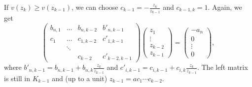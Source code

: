 \documentclass{amsart}
\theoremstyle{definition}
\begin{document}
{If $v(z_k)\geq v(z_{k-1})$, we can choose $c_{k-1}=-\frac{z_k}{z_{k-1}}$ and $c_{k-1,k}=1$. Again, we get 
\[\begin{pmatrix}
b_{n,1}&\ldots&b_{n,k-2}&b'_{n,k-1}\\
c_1&\ldots &c_{1,k-2}&c'_{1,k-1}\\
& \ddots &&\\
&&c_{k-2}&c'_{k-2,k-1}
\end{pmatrix}\begin{pmatrix}
z_1\\\vdots\\z_{k-2}\\z_{k-1}\end{pmatrix}=\begin{pmatrix}
-a_n\\0\\\vdots\\0\end{pmatrix},\]
where $b'_{n,k-1}=b_{n,k-1}+b_{n,k}\frac{z_{k}}{z_{k-1}}$ and
$c'_{i,k-1}=c_{i,k-1}+c_{i,k}\frac{z_{k}}{z_{k-1}}$. The left matrix
is still in $K_{k-1}$ and (up to a unit) $z_{k-1}=ac_1\cdots
c_{k-2}$.

}
\end{document}
